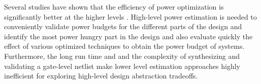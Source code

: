 
Several studies have shown that the efficiency of power optimization is significantly better at the higher levels \cite{Landman1996,Gupta2000,Raghunathan2003,Reimer2006}.
High-level power estimation is needed to conveniently validate power budgets for the different parts of the design and identify the most power hungry part in the design and also evaluate quickly the effect of various optimized techniques to obtain the power budget of systems.
Furthermore, the long run time and and the complexity of synthesizing and validating a gate-level netlist make lower level estimation approaches highly inefficient for exploring high-level design abstraction tradeoffs.

